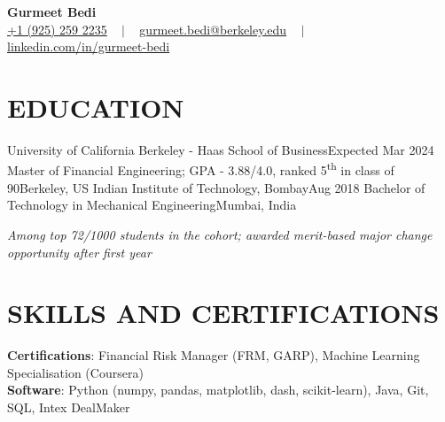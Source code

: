 

\begin{center}
{\Huge  \textbf{Gurmeet Bedi}} \\
\vspace{1pt}
\small  \href{tel:19252592235}{+1 (925) 259 2235}
~ $\mid$ ~
\href{mailto:gurmeet.bedi@berkeley.edu}{gurmeet.bedi@berkeley.edu}
~ $\mid$ ~
\href{https://www.linkedin.com/in/gurmeet-bedi/}{linkedin.com/in/gurmeet-bedi} 
\\
\vspace{1pt}
\vspace{-8pt}
\end{center}


\section{EDUCATION}
  \resumeSubHeadingListStart
  \resumeSubheading
      {University of California Berkeley - Haas School of Business}{Expected Mar 2024}
      {Master of Financial Engineering; GPA - 3.88/4.0, ranked 5\textsuperscript{th} in class of 90}{Berkeley, US}{}
    \resumeSubheading
      {Indian Institute of Technology, Bombay}{Aug 2018}
      {Bachelor of Technology in Mechanical Engineering}{Mumbai, India}{}

    \begin{itemize}[leftmargin=0.0in, label={}]
    \small{\textit{Among top 72/1000 students in the cohort; awarded merit-based major change opportunity after first year}}
    \vspace{-3pt}
    \end{itemize}
  \resumeSubHeadingListEnd


\section{SKILLS AND CERTIFICATIONS}
 \begin{itemize}[leftmargin=0.00in, label={}]
    \small{\item{
    \textbf{Certifications}{: Financial Risk Manager (FRM, GARP), Machine Learning Specialisation (Coursera)} \\
     \textbf{Software}{: 
     Python (numpy, pandas, matplotlib, dash, scikit-learn), 
     Java, 
     Git, 
     SQL, 
     Intex DealMaker
     }}}
 \end{itemize}
 \vspace{-16pt}

